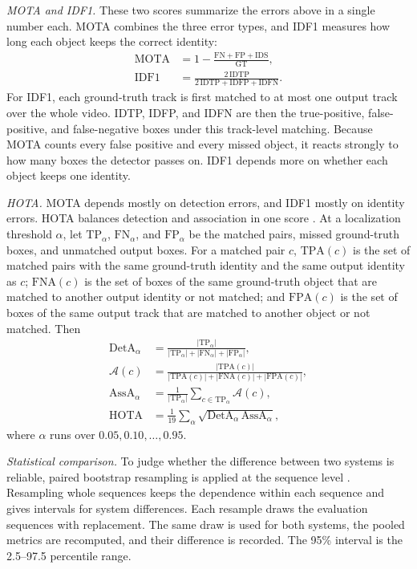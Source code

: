 \documentclass[journal]{new-aiaa}
\begin{document}
\emph{MOTA and IDF1.} These two scores summarize the errors above in a
single number each. MOTA combines the three error types, and IDF1 measures
how long each object keeps the correct identity:
\begin{align}
\mathrm{MOTA}&=1-\frac{\mathrm{FN}+\mathrm{FP}+\mathrm{IDS}}{\mathrm{GT}},\label{eq:mota}\\
\mathrm{IDF1}&=\frac{2\,\mathrm{IDTP}}{2\,\mathrm{IDTP}+\mathrm{IDFP}+\mathrm{IDFN}}.\label{eq:idf1}
\end{align}
For IDF1, each ground-truth track is first matched to at most one output
track over the whole video. IDTP, IDFP, and IDFN are then the true-positive,
false-positive, and false-negative boxes under this track-level matching.
Because MOTA counts every false positive and every missed object, it reacts
strongly to how many boxes the detector passes on. IDF1 depends more on
whether each object keeps one identity.

\emph{HOTA.} MOTA depends mostly on detection errors, and IDF1 mostly on
identity errors. HOTA balances detection and association in one score
\cite{luiten2021hota}.
At a localization threshold $\alpha$, let $\mathrm{TP}_\alpha$,
$\mathrm{FN}_\alpha$, and $\mathrm{FP}_\alpha$ be the matched pairs, missed
ground-truth boxes, and unmatched output boxes. For a matched pair $c$,
$\mathrm{TPA}(c)$ is the set of matched pairs with the same ground-truth
identity and the same output identity as $c$; $\mathrm{FNA}(c)$ is the set of
boxes of the same ground-truth object that are matched to another output
identity or not matched; and $\mathrm{FPA}(c)$ is the set of boxes of the same
output track that are matched to another object or not matched. Then
\begin{align}
\mathrm{DetA}_\alpha&=\frac{|\mathrm{TP}_\alpha|}{|\mathrm{TP}_\alpha|+|\mathrm{FN}_\alpha|+|\mathrm{FP}_\alpha|},\label{eq:deta}\\
\mathcal{A}(c)&=\frac{|\mathrm{TPA}(c)|}{|\mathrm{TPA}(c)|+|\mathrm{FNA}(c)|+|\mathrm{FPA}(c)|},\label{eq:ac}\\
\mathrm{AssA}_\alpha&=\frac{1}{|\mathrm{TP}_\alpha|}\sum_{c\in\mathrm{TP}_\alpha}\mathcal{A}(c),\label{eq:assa}\\
\mathrm{HOTA}&=\frac{1}{19}\sum_{\alpha}\sqrt{\mathrm{DetA}_\alpha\,\mathrm{AssA}_\alpha},\label{eq:hota}
\end{align}
where $\alpha$ runs over $0.05, 0.10, \dots, 0.95$.

\emph{Statistical comparison.} To judge whether the difference between two
systems is reliable, paired bootstrap resampling is applied at the sequence
level \cite{efron1993bootstrap}. Resampling whole sequences keeps the
dependence within each sequence and gives intervals for system differences. Each resample draws the evaluation sequences with
replacement. The same draw is used for both systems, the pooled metrics are
recomputed, and their difference is recorded. The 95\% interval is the
2.5--97.5 percentile range.
\end{document}
